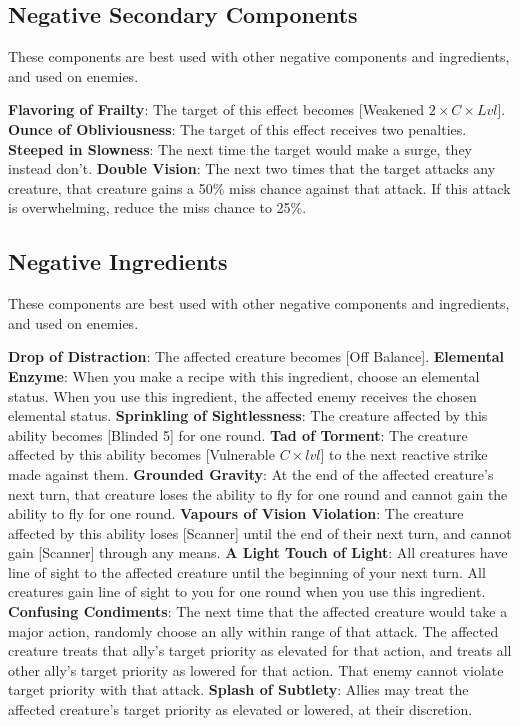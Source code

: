 \begin{multicols*}{2}
\subsection*{Negative Secondary Components}
\label{alchnegsec}
These components are best used with other negative components and ingredients, and used on enemies.
\begin{itemize}
\thing \textbf{Flavoring of Frailty}: The target of this effect becomes [Weakened $2\times C\times Lvl$].
\thing \textbf{Ounce of Obliviousness}: The target of this effect receives two penalties.
\thing \textbf{Steeped in Slowness}: The next time the target would make a surge, they instead don’t.
\thing \textbf{Double Vision}: The next two times that the target attacks any creature, that creature gains a 50\% miss chance against that attack. If this attack is overwhelming, reduce the miss chance to 25\%.
\end{itemize}

\subsection*{Negative Ingredients}
\label{alchneging}
These components are best used with other negative components and ingredients, and used on enemies.
\begin{itemize}
\thing \textbf{Drop of Distraction}: The affected creature becomes [Off Balance].
\thing \textbf{Elemental Enzyme}: When you make a recipe with this ingredient, choose an elemental status. When you use this ingredient, the affected enemy receives the chosen elemental status.
\thing \textbf{Sprinkling of Sightlessness}: The creature affected by this ability becomes [Blinded 5] for one round.
\thing \textbf{Tad of Torment}: The creature affected by this ability becomes [Vulnerable $C\times lvl$] to the next reactive strike made against them.
\thing \textbf{Grounded Gravity}: At the end of the affected creature’s next turn, that creature loses the ability to fly for one round and cannot gain the ability to fly for one round. 
\thing \textbf{Vapours of Vision Violation}: The creature affected by this ability loses [Scanner] until the end of their next turn, and cannot gain [Scanner] through any means.
\thing \textbf{A Light Touch of Light}: All creatures have line of sight to the affected creature until the beginning of your next turn. All creatures gain line of sight to you for one round when you use this ingredient.
\thing \textbf{Confusing Condiments}: The next time that the affected creature would take a major action, randomly choose an ally within range of that attack. The affected creature treats that ally’s target priority as elevated for that action, and treats all other ally’s target priority as lowered for that action. That enemy cannot violate target priority with that attack.
\thing \textbf{Splash of Subtlety}: Allies may treat the affected creature’s target priority as elevated or lowered, at their discretion.
\end{itemize}

\end{multicols*}

